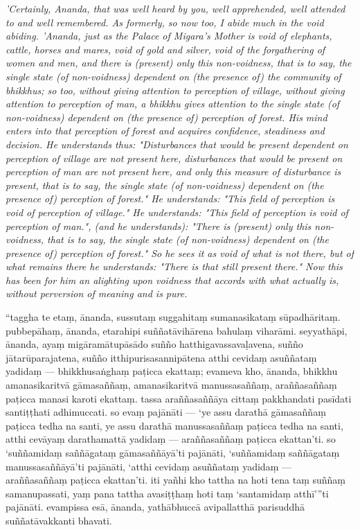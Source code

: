 \documentclass[12pt]{article}
\begin{document}
\begin{paracol}{2}
\begin{column}
{\itshape\footnotesize 'Certainly, Ananda, that was well heard by you, well apprehended, well attended to and well remembered. As formerly, so now too, I abide much in the void abiding. 'Ananda, just as the Palace of Migara's Mother is void of elephants, cattle, horses and mares, void of gold and silver, void of the forgathering of women and men, and there is (present) only this non-voidness, that is to say, the single state (of non-voidness) dependent on (the presence of) the community of bhikkhus; so too, without giving attention to perception of village, without giving attention to perception of man, a bhikkhu gives attention to the single state (of non-voidness) dependent on (the presence of) perception of forest. His mind enters into that perception of forest and acquires confidence, steadiness and decision. He understands thus: "Disturbances that would be present dependent on perception of village are not present here, disturbances that would be present on perception of man are not present here, and only this measure of disturbance is present, that is to say, the single state (of non-voidness) dependent on (the presence of) perception of forest." He understands: "This field of perception is void of perception of village." He understands: "This field of perception is void of perception of man.", (and he understands): "There is (present) only this non-voidness, that is to say, the single state (of non-voidness) dependent on (the presence of) perception of forest." So he sees it as void of what is not there, but of what remains there he understands: "There is that still present there." Now this has been for him an alighting upon voidness that accords with what actually is, without perversion of meaning and is pure.}
\switchcolumn
	\begin{flushleft}
“taggha te etaṃ, ānanda, sussutaṃ suggahitaṃ sumanasikataṃ sūpadhāritaṃ. pubbepāhaṃ, ānanda, etarahipi suññatāvihārena bahulaṃ viharāmi. seyyathāpi, ānanda, ayaṃ migāramātupāsādo suñño hatthigavassavaḷavena, suñño jātarūparajatena, suñño itthipurisasannipātena atthi cevidaṃ asuññataṃ yadidaṃ — bhikkhusaṅghaṃ paṭicca ekattaṃ; evameva kho, ānanda, bhikkhu amanasikaritvā gāmasaññaṃ, amanasikaritvā manussasaññaṃ, araññasaññaṃ paṭicca manasi karoti ekattaṃ. tassa araññasaññāya cittaṃ pakkhandati pasīdati santiṭṭhati adhimuccati. so evaṃ pajānāti — ‘ye assu darathā gāmasaññaṃ paṭicca tedha na santi, ye assu darathā manussasaññaṃ paṭicca tedha na santi, atthi cevāyaṃ darathamattā yadidaṃ — araññasaññaṃ paṭicca ekattan’ti. so ‘suññamidaṃ saññāgataṃ gāmasaññāyā’ti pajānāti, ‘suññamidaṃ saññāgataṃ manussasaññāyā’ti pajānāti, ‘atthi cevidaṃ asuññataṃ yadidaṃ — araññasaññaṃ paṭicca ekattan’ti. iti yañhi kho tattha na hoti tena taṃ suññaṃ samanupassati, yaṃ pana tattha avasiṭṭhaṃ hoti taṃ ‘santamidaṃ atthī’”ti pajānāti. evampissa esā, ānanda, yathābhuccā avipallatthā parisuddhā suññatāvakkanti bhavati.

\end{flushleft}
\end{column}
\end{paracol}
\end{document}
